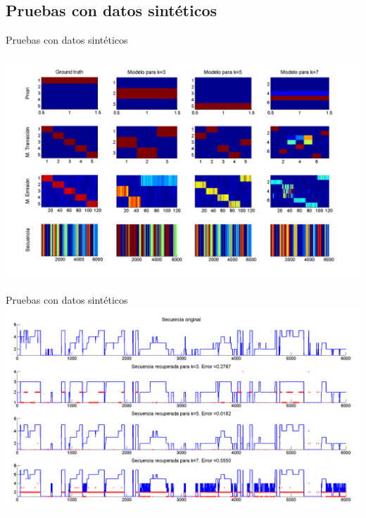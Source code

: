\documentclass[10pt]{beamer}
\begin{document}
\subsection{Pruebas con datos sintéticos}
\begin{frame}{Pruebas con datos sintéticos}
  \begin{center}
    \includegraphics[height=0.65\textwidth]{gfx/pruebasg}
  \end{center}
\end{frame}

\begin{frame}{Pruebas con datos sintéticos}
  \includegraphics[height=0.6\textwidth]{gfx/pruebasg_}
\end{frame}
\end{document}
